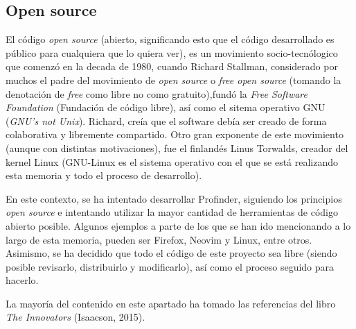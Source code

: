 \subsection{Open source}
\label{subsec:openSource}
El código \textit{open source} (abierto, significando esto que el código desarrollado es público para cualquiera que lo quiera ver), es un movimiento socio-tecnólogico que comenzó en la decada de 1980, cuando Richard Stallman, considerado por muchos el padre del movimiento de \textit{open source} o \textit{free open source} (tomando la denotación de \textit{free} como libre no como gratuito),fundó la \textit{Free Software Foundation} (Fundación de código libre)\hyperlink{cap:biblio}{}, así como el sitema operativo GNU\hyperlink{cap:biblio}{} (\textit{GNU's not Unix}). Richard, creía que el software debía ser  creado de forma colaborativa y libremente compartido. Otro gran exponente de este movimiento (aunque con distintas motivaciones), fue el finlandés Linus Torwalds, creador del kernel Linux (GNU-Linux es el sistema operativo con el que se está realizando esta memoria y todo el proceso de desarrollo).

En este contexto, se ha intentado desarrollar Profinder, siguiendo los principios \textit{open source} e intentando utilizar la mayor cantidad de herramientas de código abierto posible. Algunos ejemplos a parte de los que se han ido mencionando a lo largo de esta memoria, pueden ser Firefox\hyperlink{cap:biblio}{}, Neovim\hyperlink{cap:biblio}{} y Linux\hyperlink{cap:biblio}{}, entre otros. Asimismo, se ha decidido que todo el código de este proyecto sea libre (siendo posible revisarlo, distribuirlo y modificarlo), así como el proceso seguido para hacerlo.

La mayoría del contenido en este apartado ha tomado las referencias del libro \textit{The Innovators} (Isaacson, 2015)\hyperlink{cap:biblio}{}. 

